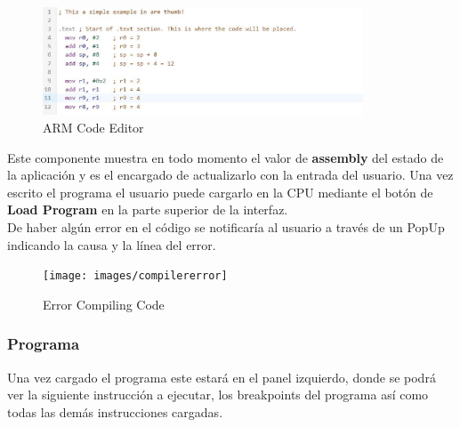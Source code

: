 {{            \begin{figure}[h]
                \centering
                \includegraphics[width=0.85\textwidth]{images/editor}
                \caption{ARM Code Editor}
            \end{figure}

            Este componente muestra en todo momento el valor de \textbf{assembly} del estado de la aplicación y es el encargado de actualizarlo con la entrada del usuario.
            Una vez escrito el programa el usuario puede cargarlo en la CPU mediante el botón de \textbf{Load Program} en la parte superior de la interfaz. \\


            De haber algún error en el código se notificaría al usuario a través de un PopUp indicando la causa y la línea del error.

            \begin{figure}[h]
                \centering
                \texttt{[image: images/compilererror]}
                \caption{Error Compiling Code}
            \end{figure}
            \clearpage
        }
        
        \subsubsection{Programa}
        {
            Una vez cargado el programa este estará en el panel izquierdo, donde se podrá ver la siguiente instrucción a ejecutar,
            los breakpoints del programa así como todas las demás instrucciones cargadas. \\
            
}}
